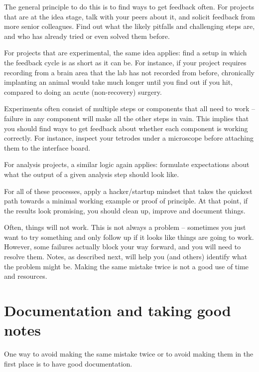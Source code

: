 \documentclass{tufte-book}
\begin{document}
The general principle to do this is to find ways to get feedback
often. For projects that are at the idea stage, talk with your peers
about it, and solicit feedback from more senior colleagues. Find out
what the likely pitfalls and challenging steps are, and who has
already tried or even solved them before.

For projects that are experimental, the same idea applies: find a
setup in which the feedback cycle is as short as it can be. For
instance, if your project requires recording from a brain area that
the lab has not recorded from before, chronically implanting an animal
would take much longer until you find out if you hit, compared to
doing an acute (non-recovery) surgery.

Experiments often consist of multiple steps or components that all
need to work -- failure in any component will make all the other steps
in vain. This implies
that you should find ways to get feedback about whether each component
is working correctly. For instance, inspect your tetrodes under a
microscope before attaching them to the interface board.

For analysis projects, a similar logic again applies: formulate
expectations about what the output of a given analysis step should
look like. 

For all of these processes, apply a hacker/startup mindset that takes
the quickest path towards a minimal working example or proof of
principle. At that point, if the results look promising, you should
clean up, improve and document things.

Often, things will not work. This is not always a problem -- sometimes
you just want to try something and only follow up if it looks like
things are going to work. However, some failures actually block your
way forward, and you will need to resolve them. Notes, as described
next, will help you (and others) identify what the problem might
be. Making the same mistake twice is not a good use of time and
resources.

\section{Documentation and taking good notes}

One way to avoid making the same mistake twice or to avoid making them
in the first place is to have good documentation.
\end{document}
